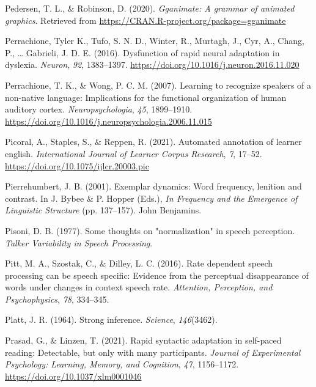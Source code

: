 \documentclass[
  11pt,
  english,
  man,floatsintext]{apa6}
\newlength{\cslhangindent}
\newlength{\cslentryspacingunit} %
\newenvironment{CSLReferences}[2] %
 {%
  \setlength{\parindent}{0pt}
  \ifodd #1
  \let\oldpar\par
  \def\par{\hangindent=\cslhangindent\oldpar}
  \fi
  \setlength{\parskip}{#2\cslentryspacingunit}
 }%
 {}
\begin{document}
\begin{CSLReferences}{1}{0}
\leavevmode{}%
Pedersen, T. L., \& Robinson, D. (2020). \emph{Gganimate: A grammar of animated graphics}. Retrieved from \url{https://CRAN.R-project.org/package=gganimate}

\leavevmode{}%
Perrachione, Tyler K., Tufo, S. N. D., Winter, R., Murtagh, J., Cyr, A., Chang, P., \ldots{} Gabrieli, J. D. E. (2016). Dysfunction of rapid neural adaptation in dyslexia. \emph{Neuron}, \emph{92}, 1383--1397. \url{https://doi.org/10.1016/j.neuron.2016.11.020}

\leavevmode{}%
Perrachione, T. K., \& Wong, P. C. M. (2007). Learning to recognize speakers of a non-native language: Implications for the functional organization of human auditory cortex. \emph{Neuropsychologia}, \emph{45}, 1899--1910. \url{https://doi.org/10.1016/j.neuropsychologia.2006.11.015}

\leavevmode{}%
Picoral, A., Staples, S., \& Reppen, R. (2021). Automated annotation of learner english. \emph{International Journal of Learner Corpus Research}, \emph{7}, 17--52. \url{https://doi.org/10.1075/ijlcr.20003.pic}

\leavevmode{}%
Pierrehumbert, J. B. (2001). Exemplar dynamics: Word frequency, lenition and contrast. In J. Bybee \& P. Hopper (Eds.), \emph{In Frequency and the Emergence of Linguistic Structure} (pp. 137--157). John Benjamins.

\leavevmode{}%
Pisoni, D. B. (1977). Some thoughts on "normalization" in speech perception. \emph{Talker Variability in Speech Processing}.

\leavevmode{}%
Pitt, M. A., Szostak, C., \& Dilley, L. C. (2016). Rate dependent speech processing can be speech specific: Evidence from the perceptual disappearance of words under changes in context speech rate. \emph{Attention, Perception, and Psychophysics}, \emph{78}, 334--345.

\leavevmode{}%
Platt, J. R. (1964). Strong inference. \emph{Science}, \emph{146}(3462).

\leavevmode{}%
Prasad, G., \& Linzen, T. (2021). Rapid syntactic adaptation in self-paced reading: Detectable, but only with many participants. \emph{Journal of Experimental Psychology: Learning, Memory, and Cognition}, \emph{47}, 1156--1172. \url{https://doi.org/10.1037/xlm0001046}


\end{CSLReferences}
\end{document}
